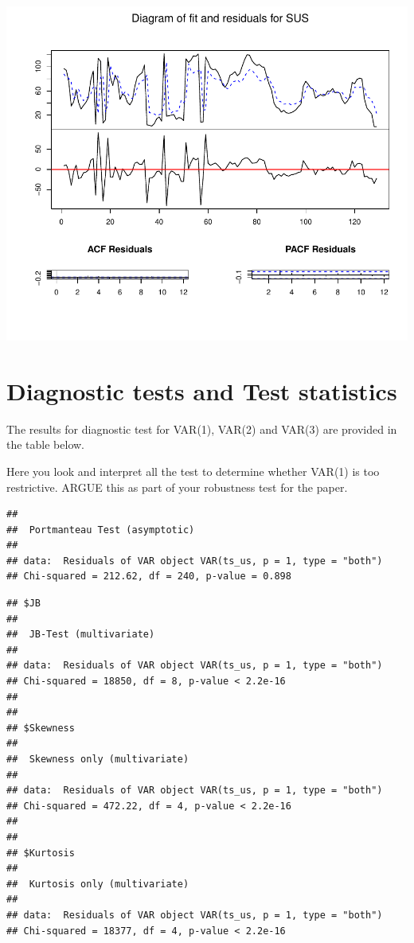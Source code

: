 \documentclass[11pt,preprint, authoryear]{elsarticle}
\numberwithin{equation}{section}
\numberwithin{figure}{section}
\numberwithin{table}{section}
\begin{document}
\includegraphics{replication_files/figure-latex/unnamed-chunk-3-4.pdf}

\hypertarget{diagnostic-tests-and-test-statistics}{%
\section{Diagnostic tests and Test
statistics}\label{diagnostic-tests-and-test-statistics}}

The results for diagnostic test for VAR(1), VAR(2) and VAR(3) are
provided in the table below.

Here you look and interpret all the test to determine whether VAR(1) is
too restrictive. ARGUE this as part of your robustness test for the
paper.

\begin{verbatim}
## 
##  Portmanteau Test (asymptotic)
## 
## data:  Residuals of VAR object VAR(ts_us, p = 1, type = "both")
## Chi-squared = 212.62, df = 240, p-value = 0.898
\end{verbatim}

\begin{verbatim}
## $JB
## 
##  JB-Test (multivariate)
## 
## data:  Residuals of VAR object VAR(ts_us, p = 1, type = "both")
## Chi-squared = 18850, df = 8, p-value < 2.2e-16
## 
## 
## $Skewness
## 
##  Skewness only (multivariate)
## 
## data:  Residuals of VAR object VAR(ts_us, p = 1, type = "both")
## Chi-squared = 472.22, df = 4, p-value < 2.2e-16
## 
## 
## $Kurtosis
## 
##  Kurtosis only (multivariate)
## 
## data:  Residuals of VAR object VAR(ts_us, p = 1, type = "both")
## Chi-squared = 18377, df = 4, p-value < 2.2e-16
\end{verbatim}
\end{document}
